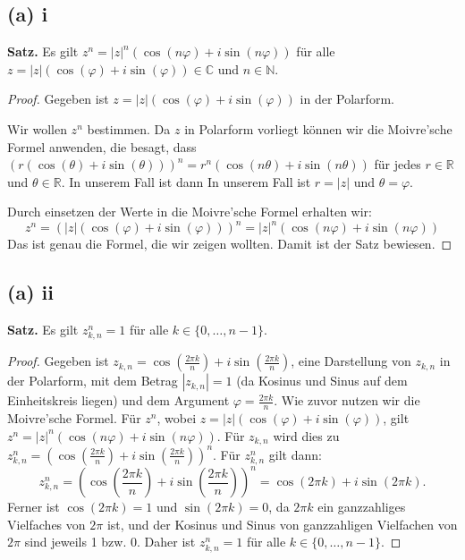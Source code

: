 \documentclass{article}
\theoremstyle{definition}
\theoremstyle{remark}
\begin{document}
\subsection*{(a) i}

\textbf{Satz.} Es gilt \( z^n = |z|^n(\cos(n \varphi) + i \sin(n \varphi))\) für alle \( z = |z|(\cos(\varphi) + i \sin(\varphi)) \in \mathbb{C} \) und \( n \in \mathbb{N} \).

\begin{proof} Gegeben ist \( z = |z|(\cos(\varphi) + i\sin(\varphi)) \) in der Polarform.

    Wir wollen \( z^ n \) bestimmen. Da \( z \) in Polarform vorliegt können wir die Moivre'sche Formel anwenden, die besagt, dass \( (r(\cos(\theta) + i\sin(\theta)))^n = r^n(\cos(n\theta) + i\sin(n\theta)) \) für jedes \( r \in \mathbb{R} \) und \( \theta \in \mathbb{R} \). In unserem Fall ist dann In unserem Fall ist \( r = |z| \) und \( \theta = \varphi \).

    Durch einsetzen der Werte in die Moivre'sche Formel erhalten wir:
    \[ z^n = (|z|(\cos(\varphi) + i\sin(\varphi)))^n = |z|^n(\cos(n\varphi) + i\sin(n\varphi)) \]
    Das ist genau die Formel, die wir zeigen wollten. Damit ist der Satz bewiesen.
\end{proof}

\subsection*{(a) ii}

\textbf{Satz.} Es gilt \( z_{k,n}^n = 1 \) für alle \( k \in \{0, \ldots, n - 1\} \).

\begin{proof} Gegeben ist \( z_{k,n} = \cos\left(\frac{2\pi k}{n}\right) + i\sin\left(\frac{2\pi k}{n}\right) \), eine Darstellung von \( z_{k,n} \) in der Polarform, mit dem Betrag \( |z_{k,n}| = 1 \) (da Kosinus und Sinus auf dem Einheitskreis liegen) und dem Argument \( \varphi = \frac{2\pi k}{n} \). Wie zuvor nutzen wir die Moivre'sche Formel. Für \( z^n \), wobei \( z = |z|(\cos(\varphi) + i\sin(\varphi)) \), gilt \( z^n = |z|^n(\cos(n\varphi) + i\sin(n\varphi)) \). Für \( z_{k,n} \) wird dies zu \( z_{k,n}^n = (\cos\left(\frac{2\pi k}{n}\right) + i\sin\left(\frac{2\pi k}{n}\right))^n \).
    Für \( z_{k,n}^n \) gilt dann:
    \[ z_{k,n}^n = \left(\cos\left(\frac{2\pi k}{n}\right) + i\sin\left(\frac{2\pi k}{n}\right)\right)^n = \cos(2\pi k) + i\sin(2\pi k). \]
    Ferner ist \( \cos(2\pi k) = 1 \) und \( \sin(2\pi k) = 0 \), da \( 2\pi k \) ein ganzzahliges Vielfaches von \( 2\pi \) ist, und der Kosinus und Sinus von ganzzahligen Vielfachen von \( 2\pi \) sind jeweils 1 bzw. 0.
    Daher ist \( z_{k,n}^n = 1 \) für alle \( k \in \{0, \ldots, n - 1\} \).
\end{proof}
\end{document}
